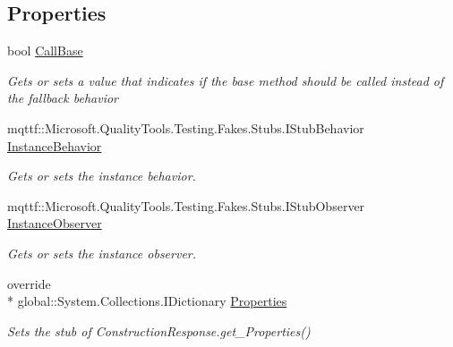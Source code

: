 \subsection*{Properties}
\begin{DoxyCompactItemize}
\item 
bool \hyperlink{class_system_1_1_runtime_1_1_remoting_1_1_messaging_1_1_fakes_1_1_stub_construction_response_a48b8407cd7a06ed5d88c3147a9b7c9b7}{Call\-Base}
\begin{DoxyCompactList}\small\item\em Gets or sets a value that indicates if the base method should be called instead of the fallback behavior\end{DoxyCompactList}\item 
mqttf\-::\-Microsoft.\-Quality\-Tools.\-Testing.\-Fakes.\-Stubs.\-I\-Stub\-Behavior \hyperlink{class_system_1_1_runtime_1_1_remoting_1_1_messaging_1_1_fakes_1_1_stub_construction_response_ad338b0b0513d66040298a1956929a83f}{Instance\-Behavior}
\begin{DoxyCompactList}\small\item\em Gets or sets the instance behavior.\end{DoxyCompactList}\item 
mqttf\-::\-Microsoft.\-Quality\-Tools.\-Testing.\-Fakes.\-Stubs.\-I\-Stub\-Observer \hyperlink{class_system_1_1_runtime_1_1_remoting_1_1_messaging_1_1_fakes_1_1_stub_construction_response_aa02f561d9a5eb6020b739242f5f23d12}{Instance\-Observer}
\begin{DoxyCompactList}\small\item\em Gets or sets the instance observer.\end{DoxyCompactList}\item 
override \\*
global\-::\-System.\-Collections.\-I\-Dictionary \hyperlink{class_system_1_1_runtime_1_1_remoting_1_1_messaging_1_1_fakes_1_1_stub_construction_response_a82e76f4d841d5ab61f9a2b1500e50798}{Properties}
\begin{DoxyCompactList}\small\item\em Sets the stub of Construction\-Response.\-get\-\_\-\-Properties()\end{DoxyCompactList}\end{DoxyCompactItemize}


